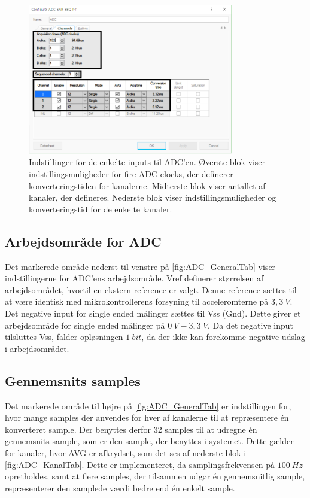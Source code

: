 \begin{figure}[H]
	\centering 
	\includegraphics[width=0.8\textwidth]{figures/ADC_instillinger2_edit.png}
	\caption{Indstillinger for de enkelte inputs til ADC'en. Øverste blok viser indstillingsmuligheder for fire ADC-clocks, der definerer konverteringstiden for kanalerne. Midterste blok viser antallet af kanaler, der defineres. Nederste blok viser indstillingsmuligheder og konverteringstid for de enkelte kanaler.}
	\label{fig:ADC_KanalTab}
\end{figure}

\subsection{Arbejdsområde for ADC}
Det markerede område nederst til venstre på \autoref{fig:ADC_GeneralTab} viser indstillingerne for ADC'ens arbejdsområde. Vref definerer størrelsen af arbejdsområdet, hvortil en ekstern reference er valgt. Denne reference sættes til at være identisk med mikrokontrollerens forsyning til acceleromterne på $3,3~V$. Det negative input for single ended målinger sættes til Vss (Gnd). Dette giver et arbejdsområde for single ended målinger på $0~V - 3,3~V$. Da det negative input tilsluttes Vss, falder opløsningen $1~bit$, da der ikke kan forekomme negative udslag i arbejdsområdet. 

\subsection{Gennemsnits samples}
Det markerede område til højre på \autoref{fig:ADC_GeneralTab} er indstillingen for, hvor mange samples der anvendes for hver af kanalerne til at repræsentere én konverteret sample. Der benyttes derfor 32 samples til at udregne én gennemsnits-sample, som er den sample, der benyttes i systemet. Dette gælder for kanaler, hvor AVG er afkrydset, som det ses af nederste blok i \autoref{fig:ADC_KanalTab}. Dette er implementeret, da samplingsfrekvensen på $100~Hz$ opretholdes, samt at flere samples, der tilsammen udgør én gennemsnitlig sample, repræsenterer den samplede værdi bedre end én enkelt sample. 





